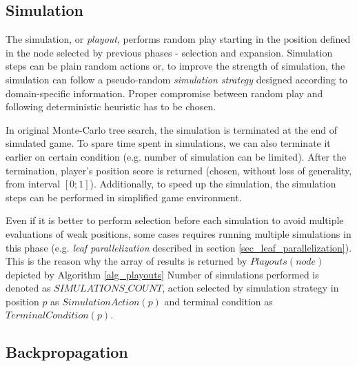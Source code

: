 \subsection{Simulation}
\label{sec_simulation}

\begin{algorithm}
\DontPrintSemicolon
\caption{$Playouts(node)$
\label{alg_playouts}}
\end{algorithm}

The simulation, or \emph{playout}, performs random play starting in the position defined in the
node selected by previous phases - selection and expansion. Simulation steps can be plain
random actions or, to improve the strength of
simulation, the simulation can follow a pseudo-random \emph{simulation strategy} designed according to
domain-specific information. Proper compromise between random play and following deterministic
heuristic has to be chosen.

In original Monte-Carlo tree search, the simulation is terminated at the end of simulated game.
To spare time spent in simulations, we can also terminate it earlier on certain condition
\cite{Ikehata2011} (e.g. number of simulation can be limited). After the termination, player's
position score is returned (chosen, without loss of generality, from interval $[0;1]$).
Additionally, to speed up the simulation, the simulation steps can be performed in
simplified game environment.

Even if it is better to perform selection before each simulation to avoid multiple 
evaluations of weak positions, some cases requires running multiple simulations in this phase
(e.g. \emph{leaf parallelization} described in section \ref{sec_leaf_parallelization}). This is
the reason why the array of results is returned by $Playouts(node)$ depicted by Algorithm
\ref{alg_playouts} Number of simulations performed is denoted as $SIMULATIONS\_COUNT$, action
selected by simulation strategy in position $p$ as $SimulationAction(p)$ and terminal condition
as $TerminalCondition(p)$.


\subsection{Backpropagation}

